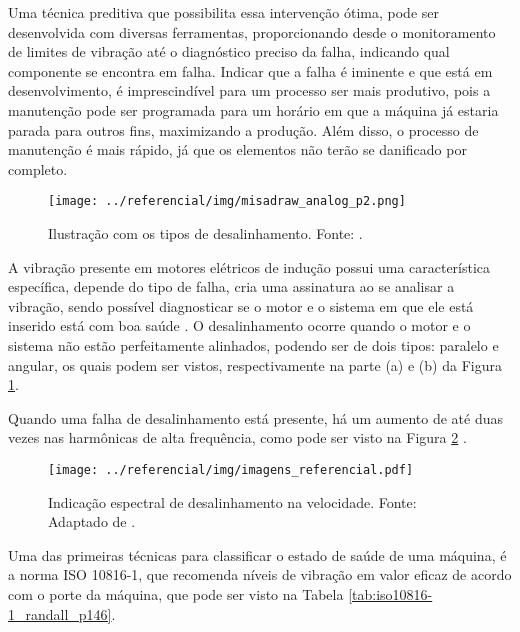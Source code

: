 \documentclass[a4paper]{ifacconf}
\begin{document}
Uma técnica preditiva que possibilita essa intervenção ótima, pode ser desenvolvida com diversas ferramentas, proporcionando desde o monitoramento
de limites de vibração até o diagnóstico preciso da falha, indicando qual componente se encontra em falha. Indicar que a falha é
iminente e que está em desenvolvimento, é imprescindível para um processo ser mais produtivo, pois a manutenção pode ser programada
para um horário em que a máquina já estaria parada para outros fins, maximizando a produção. Além disso, o processo de manutenção é mais 
rápido, já que os elementos não terão se danificado por completo.

\begin{figure}[h!]
  \begin{center}
      \texttt{[image: ../referencial/img/misadraw\_analog\_p2.png]}
  \end{center}
  \caption{Ilustração com os tipos de desalinhamento. Fonte: \cite{Sopcik2019}.}
  \label{fig:misadraw_analog_p2}
\end{figure}

A vibração presente em motores elétricos de indução possui uma característica específica, depende do tipo de falha, cria uma assinatura
ao se analisar a vibração, sendo possível diagnosticar se o motor e o sistema em que ele está inserido está com boa saúde \citep{Wu2013}.
O desalinhamento ocorre quando o motor e o sistema não estão perfeitamente alinhados, podendo ser de dois tipos: paralelo e angular, os quais 
podem ser vistos, respectivamente na parte (a) e (b) da Figura \ref{fig:misadraw_analog_p2}.

Quando uma falha de desalinhamento está presente, há um aumento de até duas vezes nas harmônicas de alta 
frequência, como pode ser visto na Figura \ref{fig:misa_analog_p2} \cite{Sopcik2019}.

\begin{figure}[H]
  \begin{center}
      \texttt{[image: ../referencial/img/imagens\_referencial.pdf]}
  \end{center}
  \caption{Indicação espectral de desalinhamento na velocidade. Fonte: Adaptado de \cite{Sopcik2019}.}
  \label{fig:misa_analog_p2}
\end{figure}

Uma das primeiras técnicas para classificar o estado de saúde de uma máquina, é a norma ISO 10816-1, que recomenda níveis de vibração 
em valor eficaz de acordo com o porte da máquina, que pode ser visto na Tabela \ref{tab:iso10816-1_randall_p146}.
\end{document}
